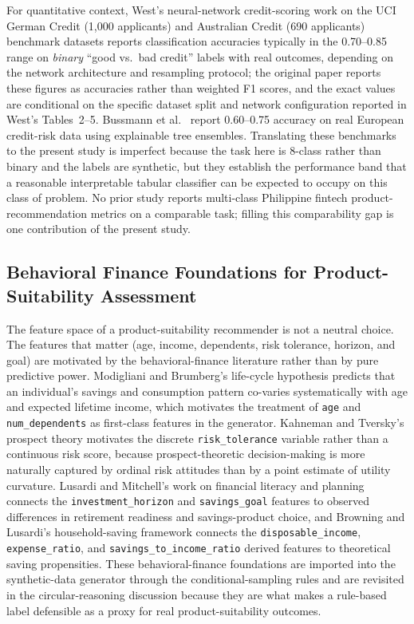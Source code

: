 \documentclass[journal]{./IEEE/IEEEtran}
\begin{document}
For quantitative context, West's \cite{ref56} neural-network credit-scoring work on the UCI German Credit (1{,}000 applicants) and Australian Credit (690 applicants) benchmark datasets reports classification accuracies typically in the 0.70--0.85 range on \emph{binary} ``good vs.\ bad credit'' labels with real outcomes, depending on the network architecture and resampling protocol; the original paper reports these figures as accuracies rather than weighted F1 scores, and the exact values are conditional on the specific dataset split and network configuration reported in West's Tables~2--5. Bussmann et al.\ \cite{ref14} report 0.60--0.75 accuracy on real European credit-risk data using explainable tree ensembles. Translating these benchmarks to the present study is imperfect because the task here is 8-class rather than binary and the labels are synthetic, but they establish the performance band that a reasonable interpretable tabular classifier can be expected to occupy on this class of problem. No prior study reports multi-class Philippine fintech product-recommendation metrics on a comparable task; filling this comparability gap is one contribution of the present study.

\subsection{Behavioral Finance Foundations for Product-Suitability Assessment}

The feature space of a product-suitability recommender is not a neutral choice. The features that matter (age, income, dependents, risk tolerance, horizon, and goal) are motivated by the behavioral-finance literature rather than by pure predictive power. Modigliani and Brumberg's life-cycle hypothesis \cite{ref65} predicts that an individual's savings and consumption pattern co-varies systematically with age and expected lifetime income, which motivates the treatment of \texttt{age} and \texttt{num\_dependents} as first-class features in the generator. Kahneman and Tversky's prospect theory \cite{ref62} motivates the discrete \texttt{risk\_tolerance} variable rather than a continuous risk score, because prospect-theoretic decision-making is more naturally captured by ordinal risk attitudes than by a point estimate of utility curvature. Lusardi and Mitchell's \cite{ref43} work on financial literacy and planning connects the \texttt{investment\_horizon} and \texttt{savings\_goal} features to observed differences in retirement readiness and savings-product choice, and Browning and Lusardi's \cite{ref55} household-saving framework connects the \texttt{disposable\_income}, \texttt{expense\_ratio}, and \texttt{savings\_to\_income\_ratio} derived features to theoretical saving propensities. These behavioral-finance foundations are imported into the synthetic-data generator through the conditional-sampling rules and are revisited in the circular-reasoning discussion because they are what makes a rule-based label defensible as a proxy for real product-suitability outcomes.
\end{document}
